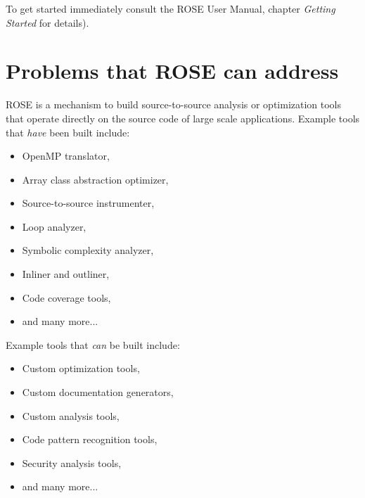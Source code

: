 To get started immediately consult the ROSE User Manual, chapter
{\em Getting Started} for details).

\section{Problems that ROSE can address}
    ROSE is a mechanism to build source-to-source analysis or 
optimization tools that operate directly on the source code of large 
scale applications.  Example tools that {\em have} been built include:
\begin{itemize}
   \item OpenMP translator,
   \item Array class abstraction optimizer,
   \item Source-to-source instrumenter,
   \item Loop analyzer,
   \item Symbolic complexity analyzer,
   \item Inliner and outliner,
   \item Code coverage tools,
   \item and many more...
\end{itemize}
Example tools that {\em can} be built include:
\begin{itemize}
   \item Custom optimization tools,
   \item Custom documentation generators,
   \item Custom analysis tools,
   \item Code pattern recognition tools,
   \item Security analysis tools,
   \item and many more...
\end{itemize}
